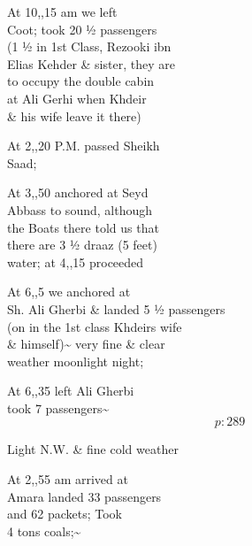 \documentclass{report}
\begin{document}
	\par{
 	At 10,,15 am we left\ \\Coot; took 20 ½ passengers\ \\(1 ½ in 1st Class, Rezooki ibn\ \\Elias Kehder \& sister, they are\ \\to occupy the double cabin\ \\at Ali Gerhi when Khdeir\ \\\& his wife leave it there)\ \\
	}

	\par{
 	At 2,,20 P.M. passed Sheikh\ \\Saad;\ \\
	}

	\par{
 	At 3,,50 anchored at Seyd\ \\Abbass to sound, although\ \\the Boats there told us that\ \\there are 3 ½ draaz (5 feet)\ \\water; at 4,,15 proceeded\ \\
	}

	\par{
 	At 6,,5 we anchored at\ \\Sh. Ali Gherbi \& landed 5 ½ passengers\ \\(on in the 1st class Khdeirs wife\ \\\& himself)\~{} very fine \& clear\ \\weather moonlight night;\ \\
	}

	\par{
 	At 6,,35 left Ali Gherbi\ \\took 7 passengers\~{}\ \\
  \[p: 289 \]

	}



	\par{
 	Light N.W. \& fine cold weather\ \\
	}

	\par{
 	At 2,,55 am arrived at\ \\Amara landed 33 passengers\ \\and 62 packets; Took\ \\4 tons coals;\~{}\ \\
	}
\end{document}
